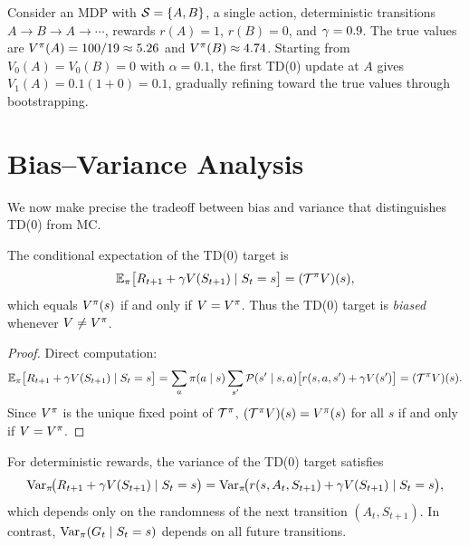 \documentclass[11pt,a4paper]{article}
\begin{document}
\begin{example}
\label{ex:two_state}
Consider an MDP with $\mathcal{S} = \{A, B\}$, a single action,
deterministic transitions $A \to B \to A \to \cdots$, rewards
$r(A) = 1$, $r(B) = 0$, and $\gamma = 0.9$. The true values are
$V^{\pi}(A) = 100/19 \approx 5.26$ and $V^{\pi}(B) \approx 4.74$.
Starting from $V_0(A) = V_0(B) = 0$ with $\alpha = 0.1$, the first
TD(0) update at $A$ gives $V_1(A) = 0.1(1 + 0) = 0.1$, gradually
refining toward the true values through bootstrapping.
\end{example}

\section{Bias--Variance Analysis}
\label{sec:bias_variance}

We now make precise the tradeoff between bias and variance that
distinguishes TD(0) from MC.

\begin{proposition}
\label{prop:td0_bias}
The conditional expectation of the TD(0) target is
\begin{equation}
  \mathbb{E}_\pi\bigl[R_{t+1} + \gamma V(S_{t+1}) \mid S_t = s\bigr]
  = (\mathcal{T}^\pi V)(s),
  \label{eq:td0_bias}
\end{equation}
which equals $V^{\pi}(s)$ if and only if $V = V^{\pi}$. Thus the TD(0)
target is \emph{biased} whenever $V \neq V^{\pi}$.
\end{proposition}

\begin{proof}
Direct computation:
\begin{equation}
  \mathbb{E}_\pi\bigl[R_{t+1} + \gamma V(S_{t+1}) \mid S_t = s\bigr]
  = \sum_a \pi(a \mid s) \sum_{s'} \mathcal{P}(s' \mid s, a)
    \bigl[r(s,a,s') + \gamma V(s')\bigr]
  = (\mathcal{T}^\pi V)(s).
\end{equation}
Since $V^{\pi}$ is the unique fixed point of $\mathcal{T}^\pi$,
$(\mathcal{T}^\pi V)(s) = V^{\pi}(s)$ for all $s$ if and only if
$V = V^{\pi}$.
\end{proof}

\begin{proposition}
\label{prop:td0_variance}
For deterministic rewards, the variance of the TD(0) target satisfies
\begin{equation}
  \operatorname{Var}_\pi\!\bigl(R_{t+1} + \gamma V(S_{t+1}) \mid S_t = s\bigr)
  = \operatorname{Var}_\pi\!\bigl(r(s, A_t, S_{t+1}) + \gamma V(S_{t+1})
    \mid S_t = s\bigr),
  \label{eq:td0_variance}
\end{equation}
which depends only on the randomness of the next transition
$(A_t, S_{t+1})$. In contrast, $\operatorname{Var}_\pi(G_t \mid S_t = s)$
depends on all future transitions.
\end{proposition}
\end{document}
